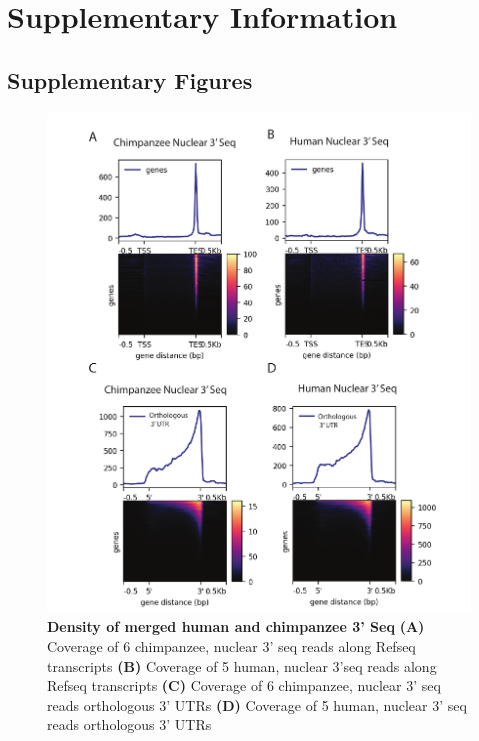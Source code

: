 \clearpage

\section{Supplementary Information}\label{ch03-supplementary-information}

\subsection{Supplementary Figures}\label{ch03-supplementary-figures}

\clearpage

\begin{figure}[!htb]
\centering
\includegraphics[width=5in]{img/ch03/Fig1-figSup1.pdf}
\caption[Density of merged human and chimpanzee 3' Seq]{\textbf{Density of merged human and chimpanzee 3' Seq} {\bf (A)}  Coverage of 6 chimpanzee, nuclear 3' seq reads along Refseq transcripts {\bf (B)}  Coverage of 5 human, nuclear 3'seq reads along Refseq transcripts {\bf (C)}  Coverage of 6 chimpanzee, nuclear 3' seq reads orthologous 3' UTRs {\bf (D)} Coverage of 5 human, nuclear 3' seq reads orthologous 3' UTRs}
\label{fig:ch03-deeptools}
\end{figure}
\clearpage


